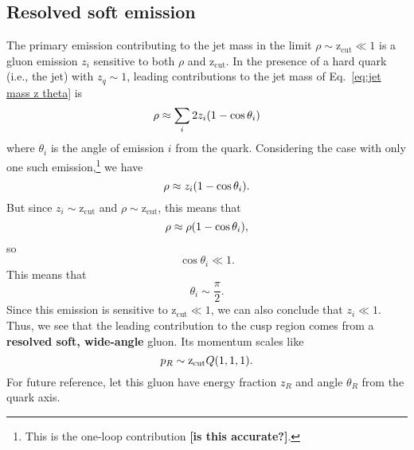 \documentclass[12pt,twoside,class=../reedthesis, crop=false]{standalone}
\providecommand{\zcut}{\mathrm{z_{cut}}}
\begin{document}
\subsection{Resolved soft emission}
	The primary emission contributing to the jet mass in the limit $\rho \sim \zcut \ll 1$ is a gluon emission $z_i$ sensitive to both $\rho$ and $\zcut$. In the presence of a hard quark (i.e., the jet) with $z_q \sim 1$, leading contributions to the jet mass of Eq.~\ref{eq:jet mass z theta} is
	\begin{equation}
		\rho \approx \sum_i 2z_i \qty(1 - \cos\theta_i)
	\end{equation}
	where $\theta_i$ is the angle of emission $i$ from the quark. Considering the case with only one such emission,\footnote{This is the one-loop contribution {\color{red}\textbf{[is this accurate?]}}.} we have
	\begin{equation}
		\rho \approx z_i \qty(1 - \cos\theta_i).
	\end{equation} 
	But since $z_i \sim \zcut$ and $\rho \sim \zcut$, this means that
	\begin{equation}
		\rho \approx \rho \qty(1 - \cos\theta_i),
	\end{equation}
	so
	\begin{equation}
		\cos\theta_i \ll 1.
	\end{equation}
	This means that
	\begin{equation}
		\theta_i \sim \frac{\pi}{2}.
	\end{equation}
	Since this emission is sensitive to $\zcut \ll 1$, we can also conclude that $z_i \ll 1$. Thus, we see that the leading contribution to the cusp region comes from a \textbf{resolved soft, wide-angle} gluon. Its momentum scales like
	\begin{equation}
		p_R \sim \zcut Q \qty(1, 1, 1).
	\end{equation}
	For future reference, let this gluon have energy fraction $z_R$ and angle $\theta_R$ from the quark axis.
\end{document}
